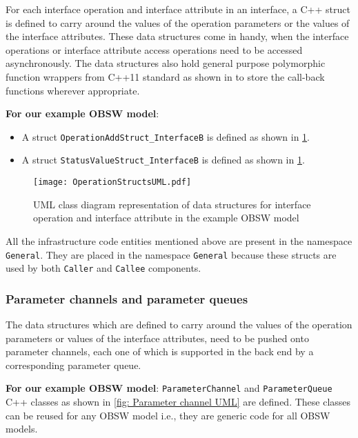 For each interface operation and interface attribute in an interface, a C++ struct is defined to carry around the values of the operation parameters or the values of the interface attributes. These data structures come in handy, when the interface operations or interface attribute access operations need to be accessed asynchronously. The data structures also hold general purpose polymorphic function wrappers from C++11 standard as shown in \cite{C++11CallBack} to store the call-back functions wherever appropriate. 

\textbf{For our example OBSW model}:
\begin{itemize}
\item A struct \texttt{OperationAdd\allowbreak Struct\_\allowbreak InterfaceB} is defined as shown in \cref{fig: Operation structs UML}.
\item A struct \texttt{StatusValue\allowbreak Struct\_\allowbreak InterfaceB} is defined as shown in \cref{fig: Operation structs UML}.
\end{itemize} 

\begin{figure}[h]
	\centering
	\texttt{[image: OperationStructsUML.pdf]}
	\caption{UML class diagram representation of data structures for interface operation and interface attribute in the example OBSW model}
	\label{fig: Operation structs UML}
\end{figure} 

All the infrastructure code entities mentioned above are present in the namespace \texttt{General}. They are placed in the namespace \texttt{General} because these structs are used by both \texttt{Caller} and \texttt{Callee} components.

\subsubsection{\textbf{Parameter channels and parameter queues}}
The data structures which are defined to carry around the values of the operation parameters or values of the interface attributes, need to be pushed onto parameter channels, each one of which is supported in the back end by a corresponding parameter queue.

\textbf{For our example OBSW model}: \texttt{Parameter\allowbreak Channel} and \texttt{Parameter\allowbreak Queue} C++ classes as shown in \cref{fig: Parameter channel UML} are defined. These classes can be reused for any OBSW model i.e., they are generic code for all OBSW models. 


